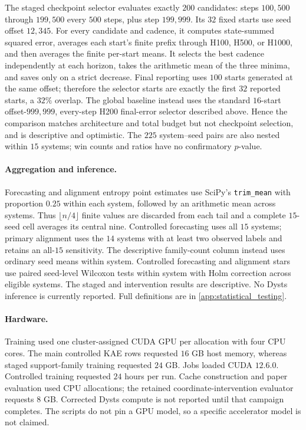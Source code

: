The staged checkpoint selector evaluates exactly \(200\) candidates: steps \(100{,}500\) through \(199{,}500\) every \(500\) steps, plus step \(199{,}999\). Its \(32\) fixed starts use seed offset \(12{,}345\). For every candidate and cadence, it computes state-summed squared error, averages each start's finite prefix through H100, H500, or H1000, and then averages the finite per-start means. It selects the best cadence independently at each horizon, takes the arithmetic mean of the three minima, and saves only on a strict decrease. Final reporting uses \(100\) starts generated at the same offset; therefore the selector starts are exactly the first \(32\) reported starts, a \(32\%\) overlap. The global baseline instead uses the standard \(16\)-start offset-\(999{,}999\), every-step H200 final-error selector described above. Hence the comparison matches architecture and total budget but not checkpoint selection, and is descriptive and optimistic. The \(225\) system--seed pairs are also nested within \(15\) systems; win counts and ratios have no confirmatory \(p\)-value.

\paragraph{Aggregation and inference.}
Forecasting and alignment entropy point estimates use SciPy's \texttt{trim\_mean} with proportion \(0.25\) within each system, followed by an arithmetic mean across systems. Thus \(\lfloor n/4\rfloor\) finite values are discarded from each tail and a complete \(15\)-seed cell averages its central nine. Controlled forecasting uses all \(15\) systems; primary alignment uses the \(14\) systems with at least two observed labels and retains an all-\(15\) sensitivity. The descriptive family-count column instead uses ordinary seed means within system. Controlled forecasting and alignment stars use paired seed-level Wilcoxon tests within system with Holm correction across eligible systems. The staged and intervention results are descriptive. No Dysts inference is currently reported. Full definitions are in \cref{app:statistical_testing}.

\paragraph{Hardware.}
Training used one cluster-assigned CUDA GPU per allocation with four CPU cores. The main controlled KAE rows requested \(16\) GB host memory, whereas staged support-family training requested \(24\) GB. Jobs loaded CUDA \(12.6.0\). Controlled training requested \(24\) hours per run. Cache construction and paper evaluation used CPU allocations; the retained coordinate-intervention evaluator requests \(8\) GB. Corrected Dysts compute is not reported until that campaign completes. The scripts do not pin a GPU model, so a specific accelerator model is not claimed.
